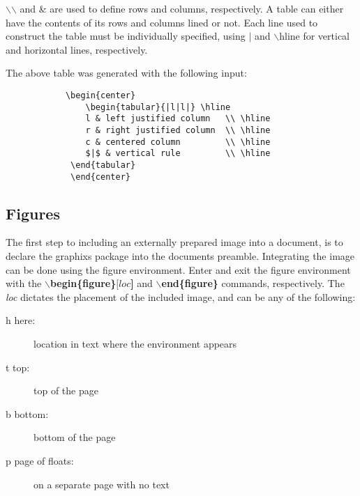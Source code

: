 $\backslash$$\backslash$ and \& are used to define rows and columns, respectively.  A table can either have the contents of its rows and columns lined or not.  Each line used to construct the table must be individually specified, using $|$ and $\backslash$hline for vertical and horizontal lines, respectively.

The above table was generated with the following input:

\begin{verbatim}
            \begin{center}
                \begin{tabular}{|l|l|} \hline
                l & left justified column   \\ \hline
                r & right justified column  \\ \hline
                c & centered column         \\ \hline
                $|$ & vertical rule         \\ \hline
             \end{tabular}
             \end{center}
\end{verbatim}

\subsection{Figures}
 The first step to including an externally prepared image into a document, is to declare the graphixs package into the documents preamble.
 Integrating the image can be done using the figure environment. Enter and exit the figure environment with the \textbf{$\backslash$begin\{figure\}$[loc$]} and \textbf{$\backslash$end\{figure\}} commands, respectively. The \textit{loc} dictates the placement of the included image, and can be any of the following:
 \begin{description}
    \item[h here:] location in text where the environment appears
    \vspace{-2mm}
    \item[t top:]  top of the page
    \vspace{-2mm}
    \item[b bottom:] bottom of the page
    \vspace{-2mm}
    \item[p page of floats:] on a separate page with no text
 \end{description}

